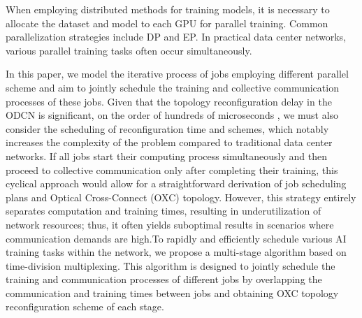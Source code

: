 \documentclass[conference]{IEEEtran}
\begin{document}

When employing distributed methods for training models, it is necessary to allocate the dataset and model to each GPU for parallel training. Common parallelization strategies include DP and EP. In practical data center networks, various parallel training tasks often occur simultaneously.


In this paper, we model the iterative process of jobs employing different parallel scheme and aim to jointly schedule the training and collective communication processes of these jobs. Given that the topology reconfiguration delay in the ODCN is significant, on the order of hundreds of microseconds \cite{Zerwas2021}, we must also consider the scheduling of reconfiguration time and schemes, which notably increases the complexity of the problem compared to traditional data center networks. If all jobs start their computing process simultaneously and then proceed to collective communication only after completing their training, this cyclical approach would allow for a straightforward derivation of job scheduling plans and Optical Cross-Connect (OXC) topology. However, this strategy entirely separates computation and training times, resulting in underutilization of network resources; thus, it often yields suboptimal results in scenarios where communication demands are high.To rapidly and efficiently schedule various AI training tasks within the network, we propose a multi-stage algorithm based on time-division multiplexing. This algorithm is designed to jointly schedule the training and communication processes of different jobs by overlapping the communication and training times between jobs and obtaining OXC topology reconfiguration scheme of each stage. 
\end{document}
